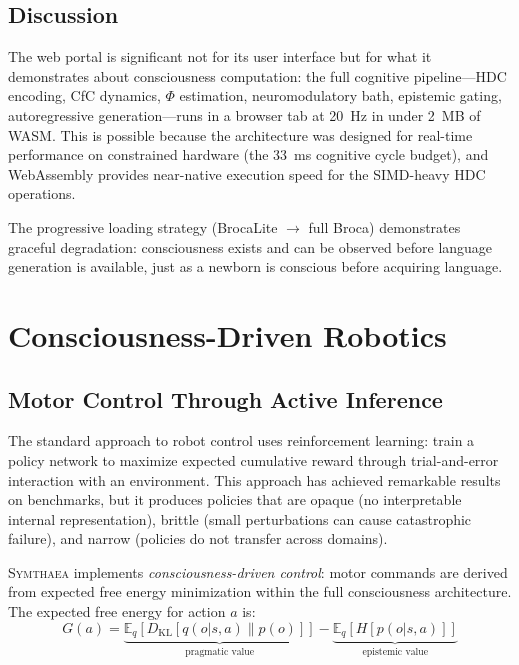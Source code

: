 \documentclass[12pt]{book}
\newcommand{\symthaea}{\textsc{Symthaea}}
\newcommand{\E}{\mathbb{E}}
\begin{document}
\section{Discussion}

The web portal is significant not for its user interface but for what it demonstrates about consciousness computation: the full cognitive pipeline---HDC encoding, CfC dynamics, $\Phi$ estimation, neuromodulatory bath, epistemic gating, autoregressive generation---runs in a browser tab at 20~Hz in under 2~MB of WASM. This is possible because the architecture was designed for real-time performance on constrained hardware (the 33~ms cognitive cycle budget), and WebAssembly provides near-native execution speed for the SIMD-heavy HDC operations.

The progressive loading strategy (BrocaLite $\to$ full Broca) demonstrates graceful degradation: consciousness exists and can be observed before language generation is available, just as a newborn is conscious before acquiring language.


\chapter{Consciousness-Driven Robotics}
\label{ch:robotics}

\section{Motor Control Through Active Inference}

The standard approach to robot control uses reinforcement learning: train a policy network to maximize expected cumulative reward through trial-and-error interaction with an environment. This approach has achieved remarkable results on benchmarks, but it produces policies that are opaque (no interpretable internal representation), brittle (small perturbations can cause catastrophic failure), and narrow (policies do not transfer across domains).

\symthaea{} implements \textit{consciousness-driven control}: motor commands are derived from expected free energy minimization within the full consciousness architecture. The expected free energy for action $a$ is:
\begin{equation}\label{eq:efe}
G(a) = \underbrace{\E_q[D_{\text{KL}}[q(o|s, a) \| p(o)]]}_{\text{pragmatic value}} - \underbrace{\E_q[H[p(o|s, a)]]}_{\text{epistemic value}}
\end{equation}
\end{document}
